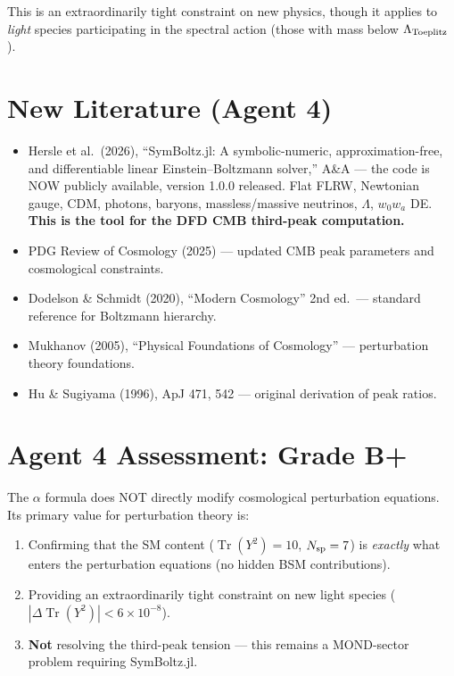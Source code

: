 \documentclass[11pt,a4paper]{article}
\newcommand{\Tr}{\operatorname{Tr}}
\begin{document}
This is an extraordinarily tight constraint on new physics, though it applies to \emph{light} species participating in the spectral action (those with mass below $\Lambda_{\rm Toeplitz}$).

\section{New Literature (Agent 4)}

\begin{itemize}
\item Hersle et al.\ (2026), ``SymBoltz.jl: A symbolic-numeric, approximation-free, and differentiable linear Einstein--Boltzmann solver,'' A\&A --- the code is NOW publicly available, version 1.0.0 released. Flat FLRW, Newtonian gauge, CDM, photons, baryons, massless/massive neutrinos, $\Lambda$, $w_0w_a$ DE. \textbf{This is the tool for the DFD CMB third-peak computation.}
\item PDG Review of Cosmology (2025) --- updated CMB peak parameters and cosmological constraints.
\item Dodelson \& Schmidt (2020), ``Modern Cosmology'' 2nd ed.\ --- standard reference for Boltzmann hierarchy.
\item Mukhanov (2005), ``Physical Foundations of Cosmology'' --- perturbation theory foundations.
\item Hu \& Sugiyama (1996), ApJ 471, 542 --- original derivation of peak ratios.
\end{itemize}

\section{Agent 4 Assessment: Grade B+}

The $\alpha$ formula does NOT directly modify cosmological perturbation equations. Its primary value for perturbation theory is:
\begin{enumerate}
\item Confirming that the SM content ($\Tr(Y^2) = 10$, $N_{\rm sp} = 7$) is \emph{exactly} what enters the perturbation equations (no hidden BSM contributions).
\item Providing an extraordinarily tight constraint on new light species ($|\Delta\Tr(Y^2)| < 6 \times 10^{-8}$).
\item \textbf{Not} resolving the third-peak tension --- this remains a MOND-sector problem requiring SymBoltz.jl.
\end{enumerate}
\end{document}
